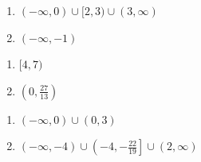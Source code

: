 \documentclass{ximera}
\begin{document}
\begin{multicols}{2}
\begin{enumerate}
\setcounter{enumi}{\value{HW}}

\item $(-\infty, 0) \cup [2,3) \cup (3, \infty)$
\item $(-\infty, -1)$  


\setcounter{HW}{\value{enumi}}
\end{enumerate}
\end{multicols}

\begin{multicols}{2}
\begin{enumerate}
\setcounter{enumi}{\value{HW}}

\item $[4,7)$  
\item $\left(0, \frac{27}{13} \right)$

\setcounter{HW}{\value{enumi}}
\end{enumerate}
\end{multicols}

\begin{multicols}{2}
\begin{enumerate}
\setcounter{enumi}{\value{HW}}
\item $(-\infty, 0) \cup (0,3)$   \vphantom{$(-\infty, -4) \cup \left(-4, -\frac{22}{19}\right] \cup (2, \infty)$}
\item $(-\infty, -4) \cup \left(-4, -\frac{22}{19}\right] \cup (2, \infty)$

\setcounter{HW}{\value{enumi}}
\end{enumerate}
\end{multicols}
\end{document}
